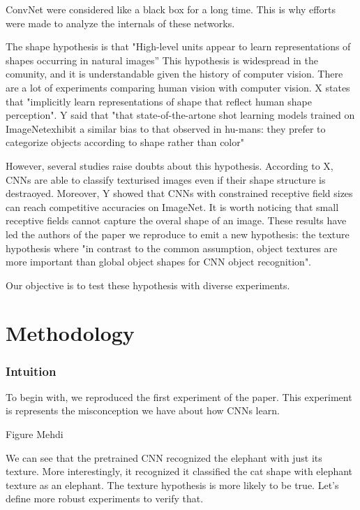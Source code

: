 \documentclass{article}
\begin{document}
ConvNet were considered like a black box for a long time.
This is why efforts were made to analyze the internals of these networks.

The shape hypothesis is that "High-level units appear to learn
representations of shapes occurring in natural images” \cite{Kriegeskorte029876}
This hypothesis is widespread in the comunity, and
it is understandable given the history of computer vision.
There are a lot of experiments comparing human vision with computer vision.
X states that "implicitly learn representations of shape
 that reflect human shape perception".
Y said that "that  state-of-the-artone  shot  learning  models  trained  on  ImageNetexhibit  a  similar  bias  to  that  observed  in  hu-mans:  
they prefer to categorize objects according  to  shape  rather  than  color" \cite{ritter2017cognitive}

However, several studies raise doubts about this hypothesis.
According to X, CNNs are able to classify texturised images even if their shape structure is destraoyed.
Moreover, Y showed that CNNs with constrained receptive field sizes can reach competitive accuracies on ImageNet.
It is worth noticing that small receptive fields cannot capture the overal shape of an image.
These results have led the authors of the paper we reproduce \cite{geirhos2018imagenettrained} 
to emit a new hypothesis: the texture hypothesis where "in contrast to the
common assumption, object textures are more important than global object shapes for CNN object
recognition".

Our objective is to test these hypothesis with diverse experiments.

\section{Methodology}

\subsubsection{Intuition}

To begin with, we reproduced the first experiment of the paper. This experiment
is represents the misconception we have about how CNNs learn.

Figure Mehdi

We can see that the pretrained CNN recognized the elephant with just its texture.
More interestingly, it recognized it classified the cat shape with elephant texture as an elephant.
The texture hypothesis is more likely to be true.
Let's define more robust experiments to verify that.
\end{document}
